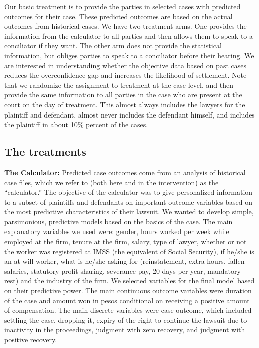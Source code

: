 \documentclass[11pt]{article}
\begin{document}
Our basic treatment is to provide the parties in selected cases with predicted outcomes for their case. These predicted outcomes are based on the actual outcomes from historical cases. We have two treatment arms. One provides the information from the calculator to all parties and then allows them to speak to a conciliator if they want. The other arm does not provide the statistical information, but obliges parties to speak to a conciliator before their hearing. We are interested in understanding whether the objective data based on past cases reduces the overconfidence gap and increases the likelihood of settlement. Note that we randomize the assignment to treatment at the case level, and then provide the same information to all parties in the case who are present at the court on the day of treatment. This almost always includes the lawyers for the plaintiff and defendant, almost never includes the defendant himself, and includes the plaintiff in about 10\% percent of the cases.  

\subsection{The treatments}
    
    \textbf{The Calculator:} Predicted case outcomes come from an analysis of historical case files, which we refer to (both here and in the intervention) as the “calculator.” The objective of the calculator was to give personalized information to a subset of plaintiffs and defendants on important outcome variables based on the most predictive characteristics of their lawsuit. We wanted to develop simple, parsimonious, predictive models based on the basics of the case. The main explanatory variables we used were: gender, hours worked per week while employed at the firm, tenure at the firm, salary, type of lawyer, whether or not the worker was registered at IMSS (the equivalent of Social Security), if he/she is an at-will worker, what is he/she asking for (reinstatement, extra hours, fallen salaries, statutory profit sharing, severance pay, 20 days per year, mandatory rest) and the industry of the firm. We selected variables for the final model based on their predictive power. The main continuous outcome variables were duration of the case and amount won in pesos conditional on receiving a positive amount of compensation. The main discrete variables were case outcome, which included settling the case, dropping it, expiry of the right to continue the lawsuit due to inactivity in the proceedings, judgment with zero recovery, and judgment with positive recovery.
    
\end{document}
